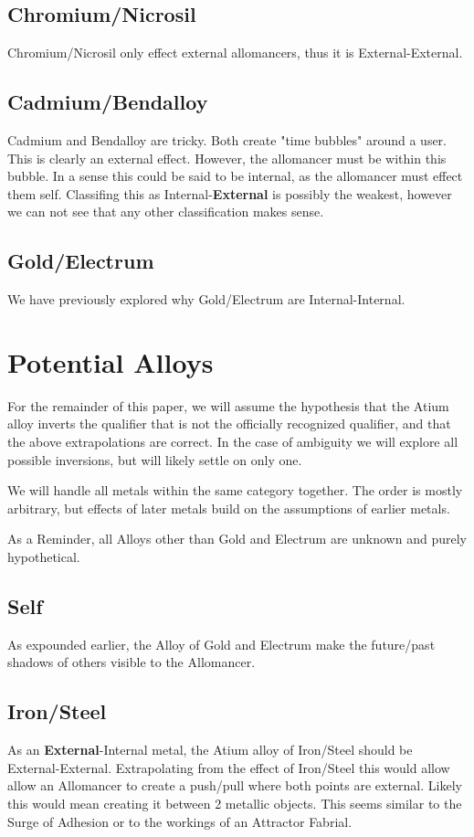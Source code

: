 \documentclass[conference]{IEEEtran}
\begin{document}
\subsection*{Chromium/Nicrosil}
Chromium/Nicrosil only effect external allomancers, thus it is External-External.
\subsection*{Cadmium/Bendalloy}
Cadmium and Bendalloy are tricky.  Both create "time bubbles" around a user.  This is clearly an external effect.  However, the allomancer must be within this bubble.  In a sense this could be said to be internal, as the allomancer must effect them self.  Classifing this as Internal-\textbf{External} is possibly the weakest, however we can not see that any other classification makes sense.
\subsection*{Gold/Electrum}
We have previously explored why Gold/Electrum are Internal-Internal.
%

\section{Potential Alloys}
For the remainder of this paper, we will assume the hypothesis that the Atium alloy inverts the qualifier that is not the officially recognized qualifier, and that the above extrapolations are correct.  In the case of ambiguity we will explore all possible inversions, but will likely settle on only one.

We will handle all metals within the same category together.
The order is mostly arbitrary, but effects of later metals build on the assumptions of earlier metals.

As a Reminder, all Alloys other than Gold and Electrum are unknown and purely hypothetical.
\subsection*{Self}
As expounded earlier, the Alloy of Gold and Electrum make the future/past shadows of others visible to the Allomancer.

\subsection*{Iron/Steel}
As an \textbf{External}-Internal metal, the Atium alloy of Iron/Steel should be External-External.  Extrapolating from the effect of Iron/Steel this would allow allow an Allomancer to create a push/pull where both points are external.  Likely this would mean creating it between 2 metallic objects.  This seems similar to the Surge of Adhesion or to the workings of an Attractor Fabrial.
\end{document}
